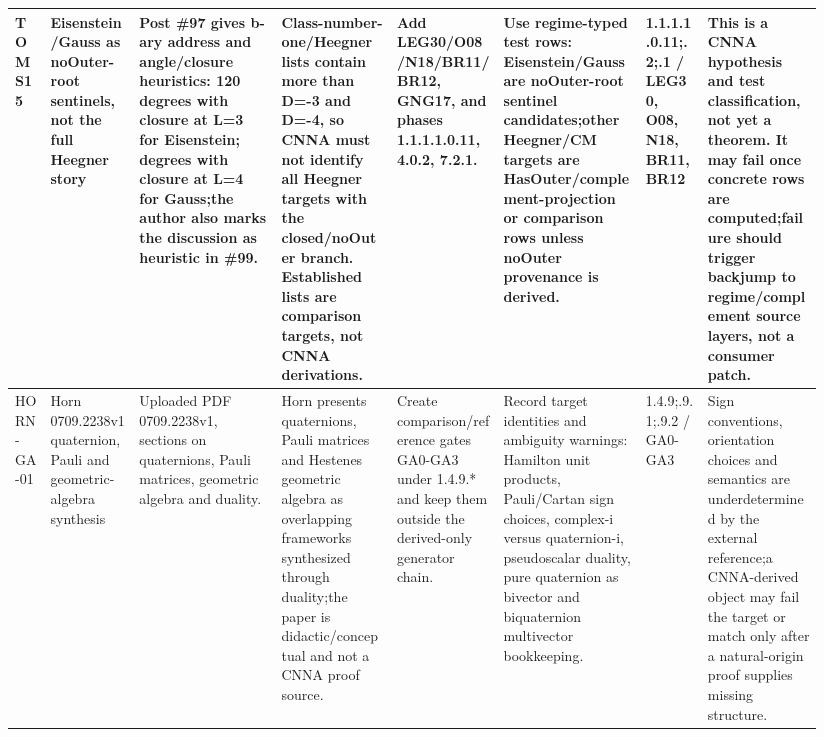 \begin{longtable}{L{0.04\linewidth} L{0.105\linewidth} L{0.16\linewidth} L{0.13\linewidth} L{0.125\linewidth} L{0.165\linewidth} L{0.075\linewidth} L{0.135\linewidth}}
TOMS15 & Eisenstein/\allowbreak{}Gauss as noOuter-root sentinels, not the full Heegner story & Post \#97 gives b-ary address and angle/\allowbreak{}closure heuristics: 120 degrees with closure at L=3 for Eisenstein; degrees with closure at L=4 for Gauss;\newline the author also marks the discussion as heuristic in \#99. & Class-number-one/\allowbreak{}Heegner lists contain more than D=-3 and D=-4, so CNNA must not identify all Heegner targets with the closed/\allowbreak{}noOuter branch. Established lists are comparison targets, not CNNA derivations. & Add LEG30/\allowbreak{}O08/\allowbreak{}N18/\allowbreak{}BR11/\allowbreak{}BR12, GNG17, and phases 1.1.1.1.0.11, 4.0.2, 7.2.1. & Use regime-typed test rows: Eisenstein/\allowbreak{}Gauss are noOuter-root sentinel candidates;\newline other Heegner/\allowbreak{}CM targets are HasOuter/\allowbreak{}complement-projection or comparison rows unless noOuter provenance is derived. & 1.1.1.1.0.11;.2;.1 /\allowbreak{} LEG30, O08, N18, BR11, BR12 & This is a CNNA hypothesis and test classification, not yet a theorem. It may fail once concrete rows are computed;\newline failure should trigger backjump to regime/\allowbreak{}complement source layers, not a consumer patch.\\
\hline
\addlinespace[0.24em]
HORN-GA-01 & Horn 0709.2238v1 quaternion, Pauli and geometric-algebra synthesis & Uploaded PDF 0709.2238v1, sections on quaternions, Pauli matrices, geometric algebra and duality. & Horn presents quaternions, Pauli matrices and Hestenes geometric algebra as overlapping frameworks synthesized through duality;\newline the paper is didactic/\allowbreak{}conceptual and not a CNNA proof source. & Create comparison/\allowbreak{}reference gates GA0-GA3 under 1.4.9.* and keep them outside the derived-only generator chain. & Record target identities and ambiguity warnings: Hamilton unit products, Pauli/\allowbreak{}Cartan sign choices, complex-i versus quaternion-i, pseudoscalar duality, pure quaternion as bivector and biquaternion multivector bookkeeping. & 1.4.9;.9.1;.9.2 /\allowbreak{} GA0-GA3 & Sign conventions, orientation choices and semantics are underdetermined by the external reference;\newline a CNNA-derived object may fail the target or match only after a natural-origin proof supplies missing structure.\\

\end{longtable}

